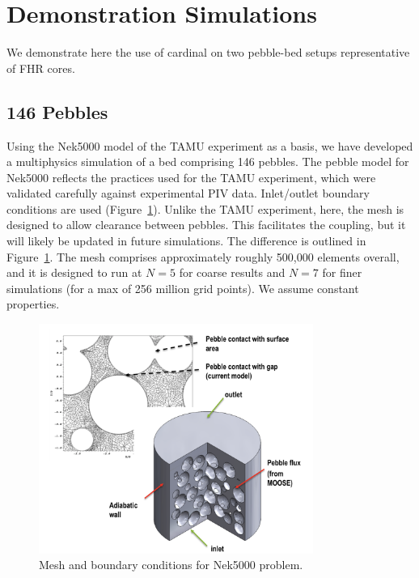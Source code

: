 \section{Demonstration Simulations}
\label{s:demo}

We demonstrate here the use of cardinal on two pebble-bed setups representative of FHR cores.

\subsection{146 Pebbles}
\label{ss:c4}

Using the Nek5000 model of the TAMU experiment as a basis, we have developed a multiphysics simulation of a bed comprising 146 pebbles.
The pebble model for Nek5000 reflects the practices used for the TAMU experiment, which were validated carefully against experimental PIV data. Inlet/outlet boundary conditions are used (Figure~\ref{f:pb2}). Unlike the TAMU experiment, here, the mesh is designed to allow clearance between pebbles. This facilitates the coupling, but it will likely be updated in future simulations. The difference is outlined in Figure~\ref{f:pb2}. The mesh comprises approximately roughly 500,000 elements overall, and it is designed to run at $N=5$ for coarse results and $N=7$ for finer simulations (for a max of 256 million grid points). We assume constant properties.

\begin{figure}[!h]
\centering
\includegraphics[clip=true,width=0.8\textwidth]{Figures/pb_mesh}
\caption{Mesh and boundary conditions for Nek5000 problem.}
\label{f:pb2}
\end{figure}

